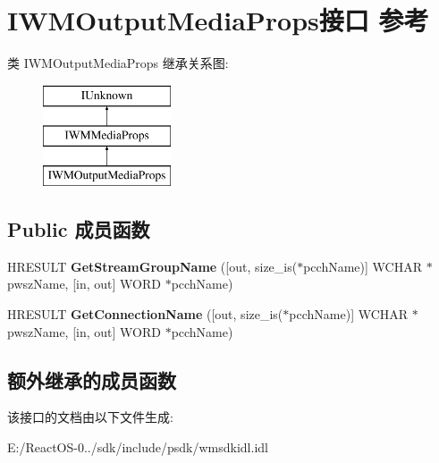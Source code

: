 \hypertarget{interface_i_w_m_output_media_props}{}\section{I\+W\+M\+Output\+Media\+Props接口 参考}
\label{interface_i_w_m_output_media_props}
类 I\+W\+M\+Output\+Media\+Props 继承关系图\+:\begin{figure}[H]
\begin{center}
\leavevmode
\includegraphics[height=3.000000cm]{interface_i_w_m_output_media_props}
\end{center}
\end{figure}
\subsection*{Public 成员函数}
\begin{DoxyCompactItemize}
\item 
\mbox{\label{interface_i_w_m_output_media_props_a8d4ae609866fe50b9367dc9d7d087d34}} 
H\+R\+E\+S\+U\+LT {\bfseries Get\+Stream\+Group\+Name} (\mbox{[}out, size\+\_\+is($\ast$pcch\+Name)\mbox{]} W\+C\+H\+AR $\ast$pwsz\+Name, \mbox{[}in, out\mbox{]} W\+O\+RD $\ast$pcch\+Name)
\item 
\mbox{\label{interface_i_w_m_output_media_props_aa41ed4a6c43d2e227e60203ea7a4e14c}} 
H\+R\+E\+S\+U\+LT {\bfseries Get\+Connection\+Name} (\mbox{[}out, size\+\_\+is($\ast$pcch\+Name)\mbox{]} W\+C\+H\+AR $\ast$pwsz\+Name, \mbox{[}in, out\mbox{]} W\+O\+RD $\ast$pcch\+Name)
\end{DoxyCompactItemize}
\subsection*{额外继承的成员函数}


该接口的文档由以下文件生成\+:\begin{DoxyCompactItemize}
\item 
E\+:/\+React\+O\+S-\/0../sdk/include/psdk/wmsdkidl.\+idl\end{DoxyCompactItemize}
